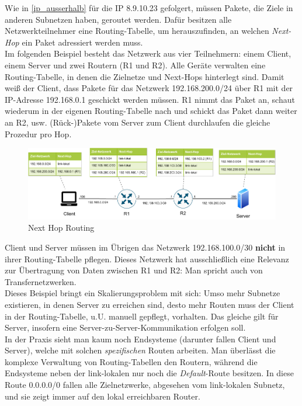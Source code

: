 Wie in \ref{ip_ausserhalb} für die IP 8.9.10.23 gefolgert, müssen Pakete, die Ziele in anderen Subnetzen haben, geroutet werden. Dafür besitzen alle Netzwerkteilnehmer eine Routing-Tabelle, um herauszufinden, an welchen \textit{Next-Hop} ein Paket adressiert werden muss.\\
Im folgenden Beispiel besteht das Netzwerk aus vier Teilnehmern: einem Client, einem Server und zwei Routern (R1 und R2). Alle Geräte verwalten eine Routing-Tabelle, in denen die Zielnetze und Next-Hops hinterlegt sind.
Damit weiß der Client, dass Pakete für das Netzwerk 192.168.200.0/24 über R1 mit der IP-Adresse 192.168.0.1 geschickt werden müssen. R1 nimmt das Paket an, schaut wiederum in der eigenen Routing-Tabelle nach und schickt das Paket dann weiter an R2, usw. (Rück-)Pakete vom Server zum Client durchlaufen die gleiche Prozedur pro Hop.\\
\begin{figure}[h]
  \centering
  \includegraphics[scale=0.9]{Figures/next_hop_routing_specific_table.pdf}
  \caption{Next Hop Routing}
  \label{grafik: next_hop_routing}
\end{figure}\FloatBarrier
Client und Server müssen im Übrigen das Netzwerk 192.168.100.0/30 \textbf{nicht} in ihrer Routing-Tabelle pflegen. Dieses Netzwerk hat ausschließlich eine Relevanz zur Übertragung von Daten zwischen R1 und R2: Man spricht auch von Transfernetzwerken.\\
Dieses Beispiel bringt ein Skalierungsproblem mit sich: Umso mehr Subnetze existieren, in denen Server zu erreichen sind, desto mehr Routen muss der Client in der Routing-Tabelle, u.U. manuell gepflegt, vorhalten. Das gleiche gilt für Server, insofern eine Server-zu-Server-Kommunikation erfolgen soll.\\
In der Praxis sieht man kaum noch Endsysteme (darunter fallen Client und Server), welche mit solchen \textit{spezifischen} Routen arbeiten. Man überlässt die komplexe Verwaltung von Routing-Tabellen den Routern, während die Endsysteme neben der link-lokalen nur noch die \textit{Default}-Route besitzen. In diese Route 0.0.0.0/0 fallen alle Zielnetzwerke, abgesehen vom link-lokalen Subnetz, und sie zeigt immer auf den lokal erreichbaren Router.\\
